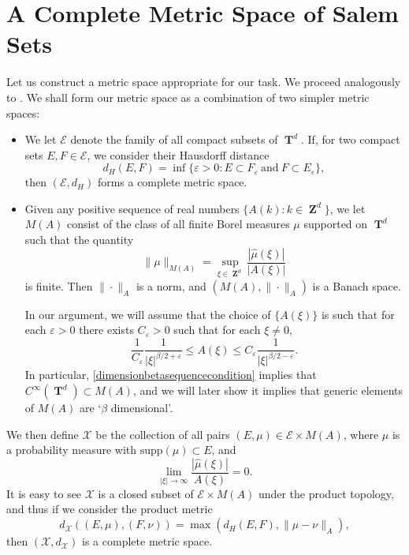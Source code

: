 \documentclass[12pt,reqno]{article}
\DeclareMathOperator{\ZZ}{\mathbf{Z}}
\DeclareMathOperator{\TT}{\mathbf{T}}
\begin{document}
\section{A Complete Metric Space of Salem Sets}

Let us construct a metric space appropriate for our task. We proceed analogously to \cite{Korner2}. We shall form our metric space as a combination of two simpler metric spaces:
%
\begin{itemize}
    \item We let $\mathcal{E}$ denote the family of all compact subsets of $\TT^d$. If, for two compact sets $E,F \in \mathcal{E}$, we consider their Hausdorff distance
    \[ d_H(E,F) = \inf \{ \varepsilon > 0 : E \subset F_\varepsilon\ \text{and}\ F \subset E_\varepsilon \}, \]
    then $(\mathcal{E},d_H)$ forms a complete metric space.

    \item Given any positive sequence of real numbers $\{ A(k) : k \in \ZZ^d \}$, we let $M(A)$ consist of the class of all finite Borel measures $\mu$ supported on $\TT^d$ such that the quantity
    \[ \| \mu \|_{M(A)} = \sup_{\xi \in \ZZ^d} \frac{|\widehat{\mu}(\xi)|}{|A(\xi)|} \]
    is finite. Then $\| \cdot \|_A$ is a norm, and $(M(A), \| \cdot \|_A)$ is a Banach space.

    In our argument, we will assume that the choice of $\{ A(\xi) \}$ is such that for each $\varepsilon > 0$ there exists $C_\varepsilon > 0$ such that for each $\xi \neq 0$,
    \begin{equation} \label{dimensionbetasequencecondition}
        \frac{1}{C_\varepsilon} \frac{1}{|\xi|^{\beta/2 + \varepsilon}} \leq A(\xi) \leq C_\varepsilon \frac{1}{|\xi|^{\beta/2 - \varepsilon}}.
    \end{equation}
    In particular, \eqref{dimensionbetasequencecondition} implies that $C^\infty(\TT^d) \subset M(A)$, and we will later show it implies that generic elements of $M(A)$ are `$\beta$ dimensional'.
\end{itemize}
%
We then define $\mathcal{X}$ be the collection of all pairs $(E,\mu) \in \mathcal{E} \times M(A)$, where $\mu$ is a probability measure with $\text{supp}(\mu) \subset E$, and
%
\[ \lim_{|\xi| \to \infty} \frac{|\widehat{\mu}(\xi)|}{A(\xi)} = 0. \]
%
It is easy to see $\mathcal{X}$ is a closed subset of $\mathcal{E} \times M(A)$ under the product topology, and thus if we consider the product metric
%
\[ d_{\mathcal{X}}((E,\mu),(F,\nu)) = \max \left( d_H(E,F), \| \mu - \nu \|_A \right), \]
%
then $(\mathcal{X},d_\mathcal{X})$ is a complete metric space.
\end{document}
